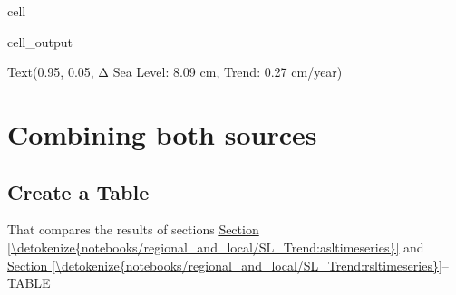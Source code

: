 \documentclass[letterpaper,10pt,english]{jupyterBook}
\begin{document}
\begin{sphinxuseclass}{cell}
\begin{sphinxVerbatimOutput}
\begin{sphinxuseclass}{cell_output}
\begin{sphinxVerbatim}[commandchars=\\\{\}]
Text(0.95, 0.05, \PYGZsq{}Δ Sea Level: 8.09 cm, Trend: 0.27 cm/year\PYGZsq{})
\end{sphinxVerbatim}

\noindent{}

\end{sphinxuseclass}\end{sphinxVerbatimOutput}

\end{sphinxuseclass}

\chapter{Combining both sources}
\label{\detokenize{notebooks/regional_and_local/SL_Trend:combining-both-sources}}

\section{Create a Table}
\label{\detokenize{notebooks/regional_and_local/SL_Trend:create-a-table}}\label{\detokenize{notebooks/regional_and_local/SL_Trend:id3}}
\sphinxAtStartPar
That compares the results of sections \hyperref[\detokenize{notebooks/regional_and_local/SL_Trend:asltimeseries}]{Section \ref{\detokenize{notebooks/regional_and_local/SL_Trend:asltimeseries}}} and \hyperref[\detokenize{notebooks/regional_and_local/SL_Trend:rsltimeseries}]{Section \ref{\detokenize{notebooks/regional_and_local/SL_Trend:rsltimeseries}}}– TABLE
\end{document}

